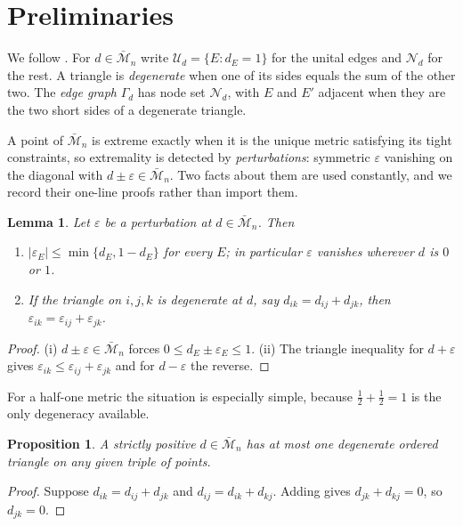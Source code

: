 \documentclass[11pt]{article}
\newtheorem{lemma}[theorem]{Lemma}
\newtheorem{proposition}[theorem]{Proposition}
\theoremstyle{definition}
\theoremstyle{remark}
\newcommand{\bM}{\bar{\mathcal{M}}}
\newcommand{\eps}{\varepsilon}
\newcommand{\NN}{\mathcal{N}}
\newcommand{\UU}{\mathcal{U}}
\begin{document}
\section{Preliminaries}
\label{sec:prelim}

We follow \cite{FK-cone}. For $d\in\bM_n$ write $\UU_d=\{E:d_E=1\}$ for the unital edges
and $\NN_d$ for the rest. A triangle is \emph{degenerate} when one of its
sides equals the sum of the other two. The \emph{edge graph} $\Gamma_d$ has node set
$\NN_d$, with $E$ and $E'$ adjacent when they are the two short sides of a degenerate
triangle.

A point of $\bM_n$ is extreme exactly when it is the unique metric satisfying its tight
constraints, so extremality is detected by \emph{perturbations}: symmetric $\eps$ vanishing
on the diagonal with $d\pm\eps\in\bM_n$. Two facts about them are used constantly, and we
record their one-line proofs rather than import them.

\begin{lemma}\label{lem:pert}
Let $\eps$ be a perturbation at $d\in\bM_n$. Then
\begin{enumerate}
\item[(i)] $|\eps_E|\leq\min\{d_E,1-d_E\}$ for every $E$; in particular $\eps$ vanishes
wherever $d$ is $0$ or $1$.
\item[(ii)] If the triangle on $i,j,k$ is degenerate at $d$, say $d_{ik}=d_{ij}+d_{jk}$,
then $\eps_{ik}=\eps_{ij}+\eps_{jk}$.
\end{enumerate}
\end{lemma}

\begin{proof}
(i) $d\pm\eps\in\bM_n$ forces $0\leq d_E\pm\eps_E\leq1$. (ii) The triangle inequality for
$d+\eps$ gives $\eps_{ik}\leq\eps_{ij}+\eps_{jk}$ and for $d-\eps$ the reverse.
\end{proof}

For a half-one metric the situation is especially simple, because $\tfrac12+\tfrac12=1$ is
the only degeneracy available.

\begin{proposition}\label{prop:onedegen}
A strictly positive $d\in\bM_n$ has at most one degenerate ordered triangle on any given
triple of points.
\end{proposition}

\begin{proof}
Suppose $d_{ik}=d_{ij}+d_{jk}$ and $d_{ij}=d_{ik}+d_{kj}$. Adding gives
$d_{jk}+d_{kj}=0$, so $d_{jk}=0$.
\end{proof}
\end{document}
